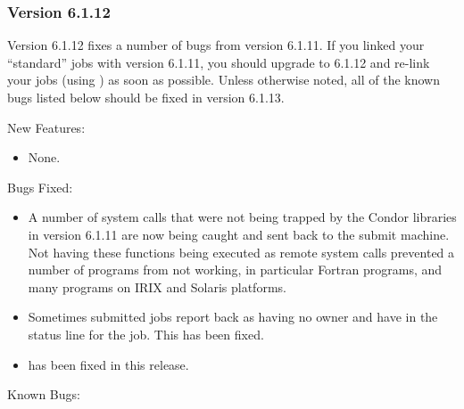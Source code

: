 \subsubsection{\label{sec:New-6-1-12}Version 6.1.12}

Version 6.1.12 fixes a number of bugs from version 6.1.11.
If you linked your ``standard'' jobs with version 6.1.11, you should
upgrade to 6.1.12 and re-link your jobs (using ) as soon as
possible.
Unless otherwise noted, all of the known bugs listed below should be fixed
in version 6.1.13.  

\noindent New Features:

\begin{itemize}

\item None.

\end{itemize}

\noindent Bugs Fixed:

\begin{itemize}

\item A number of system calls that were not being trapped by the Condor
libraries in version 6.1.11 are now being caught and sent back to the
submit machine.
Not having these functions being executed as remote system calls prevented
a number of programs from not working, in particular Fortran programs, and
many programs on IRIX and Solaris platforms.

\item Sometimes submitted jobs report back as having no owner and have
 in the status line for the job. This has been fixed.

\item {}  has been fixed in this release.

\end{itemize}

\noindent Known Bugs:

